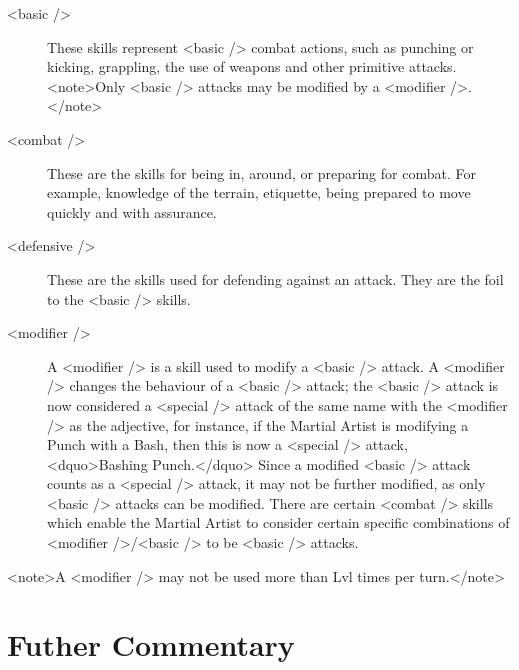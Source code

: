 \begin{description}
\item[<basic />] These skills represent <basic /> combat actions, such as
  punching or kicking, grappling, the use of weapons and other
  primitive attacks. <note>Only <basic /> attacks may be modified
    by a <modifier />.</note>
\item[<combat />] These are the skills for being in, around, or preparing
  for combat. For example, knowledge of the terrain, etiquette, being
  prepared to move quickly and with assurance.

\item[<defensive />] These are the skills used for defending against an
  attack. They are the foil to the <basic /> skills.

\item[<modifier />] A <modifier /> is a skill used to modify a <basic /> attack. A
  <modifier /> changes the behaviour of a <basic /> attack; the <basic /> attack
  is now considered a <special /> attack of the same name with the
  <modifier /> as the adjective, for instance, if the Martial Artist is
  modifying a Punch with a Bash, then this is now a <special />
  attack, <dquo>Bashing Punch.</dquo> Since a modified <basic /> attack counts as a
  <special /> attack, it may not be further modified, as only <basic />
    attacks can be modified. There are certain <combat /> skills which
  enable the Martial Artist to consider certain specific combinations
  of <modifier />/<basic /> to be <basic /> attacks.
\end{description}

<note>A <modifier /> may not be used more than Lvl times per turn.</note>


\section{Futher Commentary}

